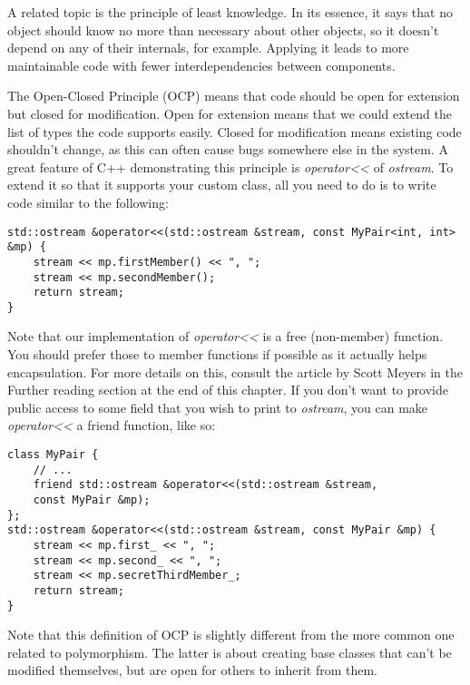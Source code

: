 A related topic is the principle of least knowledge. In its essence, it says that no object should know no more than necessary about other objects, so it doesn't depend on any of their internals, for example. Applying it leads to more maintainable code with fewer interdependencies between components.



The Open-Closed Principle (OCP) means that code should be open for extension but closed for modification. Open for extension means that we could extend the list of types the code supports easily. Closed for modification means existing code shouldn't change, as this can often cause bugs somewhere else in the system. A great feature of C++ demonstrating this principle is \textit{operator<<} of \textit{ostream}. To extend it so that it supports your custom class, all you need to do is to write code similar to the following:


\begin{lstlisting}[style=styleCXX]
std::ostream &operator<<(std::ostream &stream, const MyPair<int, int>
&mp) {
	stream << mp.firstMember() << ", ";
	stream << mp.secondMember();
	return stream;
}

\end{lstlisting}

Note that our implementation of \textit{operator<<} is a free (non-member) function. You should prefer those to member functions if possible as it actually helps encapsulation. For more details on this, consult the article by Scott Meyers in the Further reading section at the end of this chapter. If you don't want to provide public access to some field that you wish to print to \textit{ostream}, you can make \textit{operator<<} a friend function, like so:


\begin{lstlisting}[style=styleCXX]
class MyPair {
	// ...
	friend std::ostream &operator<<(std::ostream &stream,
	const MyPair &mp);
};
std::ostream &operator<<(std::ostream &stream, const MyPair &mp) {
	stream << mp.first_ << ", ";
	stream << mp.second_ << ", ";
	stream << mp.secretThirdMember_;
	return stream;
}
\end{lstlisting}

Note that this definition of OCP is slightly different from the more common one related to polymorphism. The latter is about creating base classes that can't be modified themselves, but are open for others to inherit from them.


